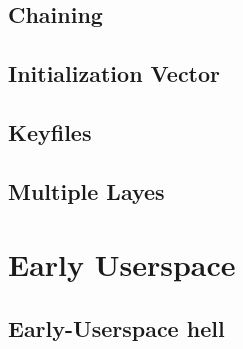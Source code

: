 \documentclass[xcolor={dvipsnames,svgnames},hyperref=dvips]{beamer}
\begin{document}
	\subsection{Chaining}
	\begin{frame}
	\end{frame}

	\subsection{Initialization Vector}
	\begin{frame}
	\end{frame}

	\subsection{Keyfiles}
	\begin{frame}
	\end{frame}

	\subsection{Multiple Layes}
	\begin{frame}
	\end{frame}

\section{Early Userspace}\label{section:hell}
	\subsection{Early-Userspace hell}
	\begin{frame}
	\end{frame}

\begin{frame}
\end{frame}
\end{document}
